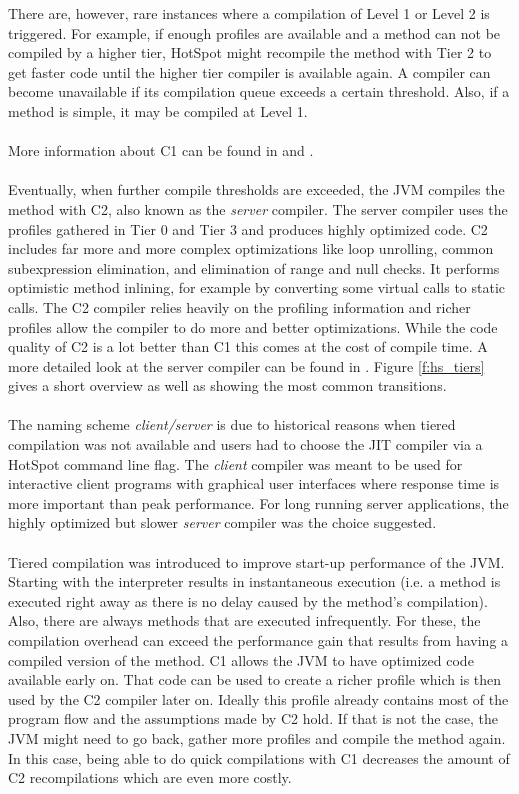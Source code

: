 There are, however, rare instances where a compilation of Level 1 or Level 2 is triggered. For example, if enough profiles are available and a method can not be compiled by a higher tier, HotSpot might recompile the method with Tier 2 to get faster code until the higher tier compiler is available again. A compiler can become unavailable if its compilation queue exceeds a certain threshold. Also, if a method is simple, it may be compiled at Level 1.
\\\\
More information about C1 can be found in \cite{client_compiler_talk} and \cite{client_compiler}.
\\\\
Eventually, when further compile thresholds are exceeded, the JVM compiles the method with C2, also known as the \textit{server} compiler.
The server compiler uses the profiles gathered in Tier 0 and Tier 3 and produces highly optimized code. C2 includes far more and more complex optimizations like loop unrolling, common subexpression elimination, and elimination of range and null checks. It performs optimistic method inlining, for example by converting some virtual calls to static calls. The C2 compiler relies heavily on the profiling information and richer profiles allow the compiler to do more and better optimizations.
While the code quality of C2 is a lot better than C1 this comes at the cost of compile time. A more detailed look at the server compiler can be found in \cite{server_compiler}.
Figure \ref{f:hs_tiers} gives a short overview as well as showing the most common transitions.
\\\\
The naming scheme \textit{client/server} is due to historical reasons when tiered compilation was not available and users had to choose the JIT compiler via a HotSpot command line flag. The \textit{client} compiler was meant to be used for interactive client programs with graphical user interfaces where response time is more important than peak performance. For long running server applications, the highly optimized but slower \textit{server} compiler was the choice suggested. 
\\\\
Tiered compilation was introduced to improve start-up performance of the JVM.
Starting with the interpreter results in instantaneous execution (i.e. a method is executed right away as there is no delay caused by the method's compilation). Also, there are always methods that are executed infrequently. For these, the compilation overhead can exceed the performance gain that results from having a compiled version of the method. C1 allows the JVM to have optimized code available early on. That code can be used to create a richer profile which is then used by the C2 compiler later on. Ideally this profile already contains most of the program flow and the assumptions made by C2 hold. If that is not the case, the JVM might need to go back, gather more profiles and compile the method again. In this case, being able to do quick compilations with C1 decreases the amount of C2 recompilations which are even more costly.

